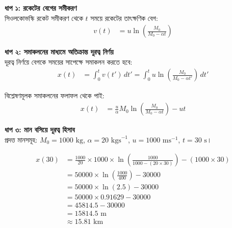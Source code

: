 \documentclass[12pt, a4paper]{article}
\begin{document}
\begin{tcolorbox}[solutionbox={সমাধান (Solution)}]
    \noindent
    \textbf{ধাপ ১: রকেটের বেগের সমীকরণ} \\
    সিওলকোভস্কি রকেট সমীকরণ থেকে $t$ সময়ে রকেটের তাৎক্ষণিক বেগ:
    \begin{align*}
        v(t) &= u \ln\left(\frac{M_0}{M_0 - \alpha t}\right)
    \end{align*}
    
    \vspace{0.5em}
    \noindent\textbf{ধাপ ২: সমাকলনের মাধ্যমে অতিক্রান্ত দূরত্ব নির্ণয়} \\
    দূরত্ব নির্ণয়ে বেগকে সময়ের সাপেক্ষে সমাকলন করতে হবে:
    \begin{align*}
        x(t) &= \int_0^t v(t') \, dt' = \int_0^t u \ln\left(\frac{M_0}{M_0 - \alpha t'}\right) \, dt'
    \end{align*}
    
    বিশ্লেষণমূলক সমাকলনের ফলাফল থেকে পাই:
    \begin{align*}
        x(t) &= \frac{u}{\alpha} M_0 \ln\left(\frac{M_0}{M_0 - \alpha t}\right) - u t
    \end{align*}
    
    \vspace{0.5em}
    \noindent\textbf{ধাপ ৩: মান বসিয়ে দূরত্ব হিসাব} \\
    প্রদত্ত মানসমূহ: $M_0 = 1000\text{ kg}$, $\alpha = 20\text{ kgs}^{-1}$, $u = 1000\text{ ms}^{-1}$, $t = 30\text{ s}$।
    
    \begin{align*}
        x(30) &= \frac{1000}{20} \times 1000 \times \ln\left(\frac{1000}{1000 - (20 \times 30)}\right) - (1000 \times 30) \\
              &= 50000 \times \ln\left(\frac{1000}{400}\right) - 30000 \\
              &= 50000 \times \ln(2.5) - 30000 \\
              &= 50000 \times 0.91629 - 30000 \\
              &= 45814.5 - 30000 \\
              &= 15814.5\text{ m} \\
              &\approx \mathbf{15.81}\text{ km}
    \end{align*}
\end{tcolorbox}
\end{document}
